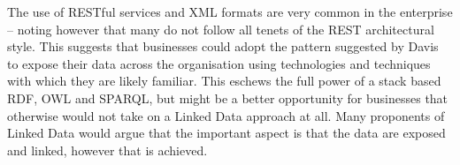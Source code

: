 The use of RESTful services and XML formats are very common in
the enterprise -- noting however that many do not follow all tenets
of the REST architectural style. This suggests that businesses
could adopt the pattern suggested by Davis to expose their
data across the organisation using technologies and techniques
with which they are likely familiar. This eschews the full power
of a stack based RDF, OWL and SPARQL, but might be a better
opportunity for businesses that otherwise would not take on a
Linked Data approach at all.  Many proponents of Linked Data would
argue that the important aspect is that the data are exposed and
linked, however that is achieved.

\begin{comment}
If we view the indexing processes
of a search application as a variant of data warehousing,
we can start to argue for enterprise-wide publishing of
linked data as a more cost effective means of building search

An important consideration is that BBC Search is largely directing
users to public pages on the BBC website, a large number of which have
already published some of their metadata as linked data. Notably, BBC News,
BBC Sport and BBC Food all use some combination
of microformats, microdata, RDFa, HTML meta tags within their HTML content
pages. Some of this was to improve search results in external search engines
such as Google and some of it ties into Facebook's Open Graph Protocol, which
enables and enhances social media sharing of the pages.

These efforts are not as structured and rich as the more notable uses
of semantic web technologies on the programmes microsites, Nature and BBC
Music \cite{raimond2010use}, but indicate that some level of metadata
can be retrieved
as linked data. In cases where the metadata are rich enough, it might be
possible to avoid direct integration with databases, hidden back end
web services and other structured ``feeds'' typically set up for enterprise
integration.
\end{comment}


